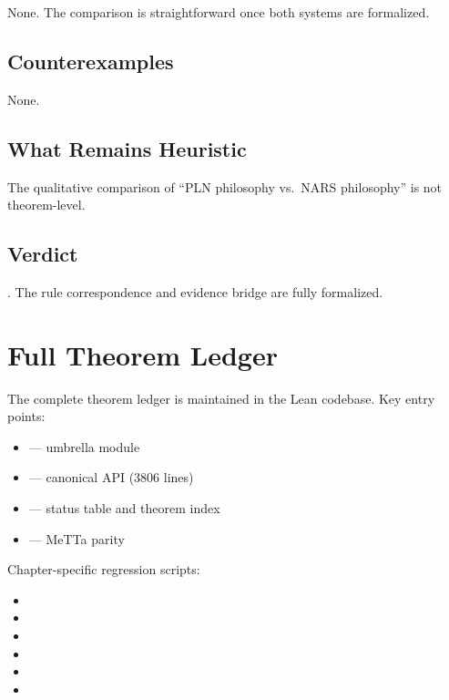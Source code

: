 \documentclass[11pt,openany]{report}
\begin{document}
None.  The comparison is straightforward once both systems are
formalized.

\section{Counterexamples}

None.

\section{What Remains Heuristic}

The qualitative comparison of ``PLN philosophy vs.\ NARS philosophy''
is not theorem-level.

\section{Verdict}

\verdictClean{}.  The rule correspondence and evidence bridge are
fully formalized.


\appendix

\chapter{Full Theorem Ledger}
\label{app:ledger}

The complete theorem ledger is maintained in the Lean codebase.
Key entry points:

\begin{itemize}
\item {} --- umbrella module
\item {} --- canonical API (3806 lines)
\item {} --- status table and theorem index
\item {} --- MeTTa parity
\end{itemize}

Chapter-specific regression scripts:
\begin{itemize}
\item {}
\item {}
\item {}
\item {}
\item {}
\item {}
\end{itemize}
\end{document}
